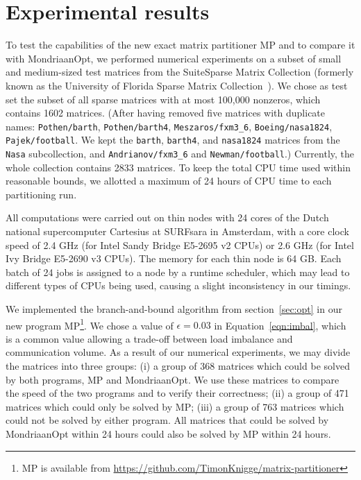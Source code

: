 \section{Experimental results}
\label{sec:experiments}
To test the capabilities of the new exact matrix partitioner MP
and to compare it with MondriaanOpt, we performed numerical experiments
on a subset of small and medium-sized test matrices from the SuiteSparse
Matrix Collection (formerly known as the University
of Florida Sparse Matrix Collection~\cite{davis11}).
We chose as test set the subset of all sparse matrices with at most 100,000 nonzeros,
which contains 1602 matrices. (After having removed five matrices with duplicate names:
	\texttt{Pothen/barth}, \texttt{Pothen/barth4}, \texttt{Meszaros/fxm3\_6},
    \texttt{Boeing/nasa1824}, \texttt{Pajek/football}.
	We kept the \texttt{barth}, \texttt{barth4}, and \texttt{nasa1824} matrices
          from the \texttt{Nasa} subcollection, and  \texttt{Andrianov/fxm3\_6} and
          \texttt{Newman/football}.)
Currently, the whole collection contains 2833 matrices.
To keep the total CPU time used within reasonable bounds, we allotted
a maximum of 24 hours of CPU time to each partitioning run.

All computations were carried out on thin nodes with 24 cores of the Dutch national supercomputer
Cartesius at  SURFsara in Amsterdam, with a core clock speed of 2.4 GHz (for Intel Sandy Bridge E5-2695 v2  CPUs)
or 2.6 GHz (for Intel Ivy Bridge E5-2690 v3 CPUs). The memory for each 
 thin node is 64 GB. Each batch of 24 jobs is assigned to a node by a runtime scheduler,
which may lead to different types of CPUs being used, causing a slight inconsistency in our timings.

We implemented the branch-and-bound algorithm from section~\ref{sec:opt} in our new program
MP\footnote{MP is available from \url{https://github.com/TimonKnigge/matrix-partitioner}}.
We chose a value of $\epsilon=0.03$ in Equation~\ref{eqn:imbal}, which is a common value
allowing a trade-off between load imbalance and communication volume. 
As a result of our numerical experiments, we may divide the matrices into three groups: (i) a group of 368 matrices which could be solved
by both programs, MP and MondriaanOpt. We use these matrices to compare the speed of the two programs
and to verify their correctness; (ii) a group of 471 matrices which could only be solved by MP;
(iii) a group of 763 matrices which could not be solved by either program.
All matrices that could be solved by MondriaanOpt within 24 hours could also be solved by 
MP within 24 hours.

